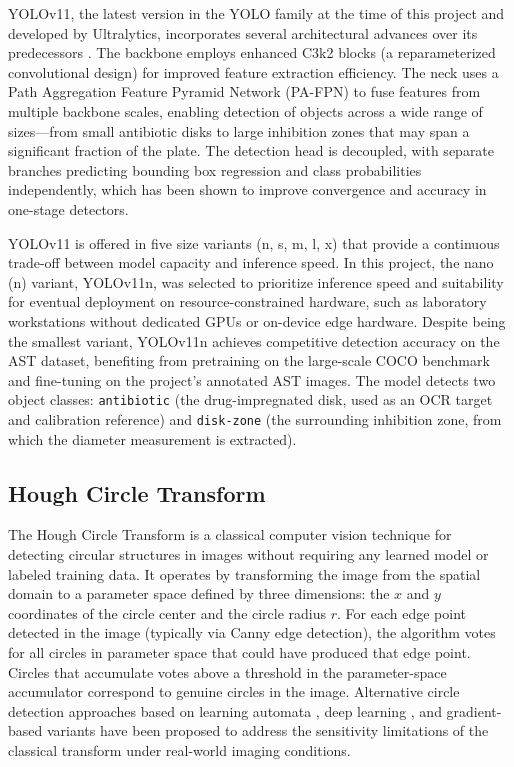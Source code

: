 YOLOv11, the latest version in the YOLO family at the time of this project and developed by
Ultralytics, incorporates several architectural advances over its predecessors \cite{wang2024yolov11}.
The backbone employs enhanced C3k2 blocks (a reparameterized convolutional design) for improved
feature extraction efficiency. The neck uses a Path Aggregation Feature Pyramid Network
(PA-FPN) to fuse features from multiple backbone scales, enabling detection of objects across
a wide range of sizes---from small antibiotic disks to large inhibition zones that may span
a significant fraction of the plate. The detection head is decoupled, with separate branches
predicting bounding box regression and class probabilities independently, which has been shown
to improve convergence and accuracy in one-stage detectors.

YOLOv11 is offered in five size variants (n, s, m, l, x) that provide a continuous trade-off
between model capacity and inference speed. In this project, the nano (n) variant, YOLOv11n,
was selected to prioritize inference speed and suitability for eventual deployment on
resource-constrained hardware, such as laboratory workstations without dedicated GPUs or
on-device edge hardware. Despite being the smallest variant, YOLOv11n achieves competitive
detection accuracy on the AST dataset, benefiting from pretraining on the large-scale COCO
benchmark and fine-tuning on the project's annotated AST images. The model detects two
object classes: \texttt{antibiotic} (the drug-impregnated disk, used as an OCR target and
calibration reference) and \texttt{disk-zone} (the surrounding inhibition zone, from which
the diameter measurement is extracted).

\subsection{Hough Circle Transform}

The Hough Circle Transform is a classical computer vision technique for detecting circular
structures in images without requiring any learned model or labeled training data. It operates
by transforming the image from the spatial domain to a parameter space defined by three
dimensions: the $x$ and $y$ coordinates of the circle center and the circle radius $r$.
For each edge point detected in the image (typically via Canny edge detection), the algorithm
votes for all circles in parameter space that could have produced that edge point. Circles that
accumulate votes above a threshold in the parameter-space accumulator correspond to genuine
circles in the image. Alternative circle detection approaches based on learning automata
\cite{cuevas2014}, deep learning \cite{ercan2020}, and gradient-based variants \cite{shehata2015hough}
have been proposed to address the sensitivity limitations of the classical transform under real-world imaging conditions.


